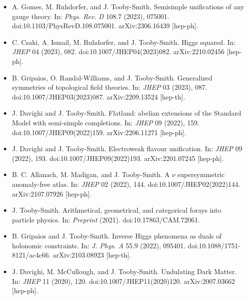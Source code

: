 \documentclass[14pt,letter]{article}
\newcommand{\mybullet}{\textcolor{mycolor}{$\ast$}\ }
\newcounter{customtitle}
\begin{document}
\vspace{0.3cm}
\begin{itemize}[label=\mybullet]

\item A. Gomes, M. Ruhdorfer, and J. Tooby-Smith. {\color{mycolor} Semisimple unifications of any gauge theory}. In: \emph{Phys. Rev. D} 108.7 (2023), 075001. doi:10.1103/PhysRevD.108.075001. arXiv:2306.16439 [hep-ph].

\item \sloppy C. Csaki, A. Ismail, M. Ruhdorfer, and J. Tooby-Smith. {\color{mycolor} Higgs squared}. In: \emph{JHEP} 04 (2023), 082. doi:10.1007/JHEP04(2023)082. arXiv:2210.02456 [hep-ph].

\item B. Gripaios, O. Randal-Williams, and J. Tooby-Smith. {\color{mycolor} Generalized symmetries of topological field theories}. In: \emph{JHEP} 03 (2023), 087. doi:10.1007/JHEP03(2023)087. arXiv:2209.13524 [hep-th].

\item J. Davighi and J. Tooby-Smith. {\color{mycolor} Flatland: abelian extensions of the Standard Model with semi-simple completions}. In: \emph{JHEP} 09 (2022), 159. doi:10.1007/JHEP09(2022)159. arXiv:2206.11271 [hep-ph].

\item J. Davighi and J. Tooby-Smith. {\color{mycolor} Electroweak flavour unification}. In: \emph{JHEP} 09 (2022), 193. doi:10.1007/JHEP09(2022)193. arXiv:2201.07245 [hep-ph].

\item B. C. Allanach, M. Madigan, and J. Tooby-Smith. {\color{mycolor} A \ensuremath{\nu} supersymmetric anomaly-free atlas}. In: \emph{JHEP} 02 (2022), 144. doi:10.1007/JHEP02(2022)144. arXiv:2107.07926 [hep-ph].

\item J. Tooby-Smith. {\color{mycolor} Arithmetical, geometrical, and categorical forays into particle physics}. In: \emph{Preprint} (2021). doi:10.17863/CAM.72061.

\item B. Gripaios and J. Tooby-Smith. {\color{mycolor} Inverse Higgs phenomena as duals of holonomic constraints}. In: \emph{J. Phys. A} 55.9 (2022), 095401. doi:10.1088/1751-8121/ac4c66. arXiv:2103.08923 [hep-th].

\item J. Davighi, M. McCullough, and J. Tooby-Smith. {\color{mycolor} Undulating Dark Matter}. In: \emph{JHEP} 11 (2020), 120. doi:10.1007/JHEP11(2020)120. arXiv:2007.03662 [hep-ph].


\end{itemize}
\end{document}

